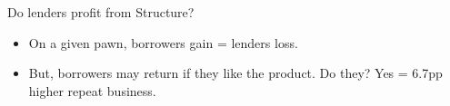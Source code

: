 \documentclass[9pt, aspectratio=169]{beamer}
\begin{document}
\begin{frame}{Do lenders profit from Structure?}

\begin{itemize}
    \item On a given pawn, borrowers gain = lenders loss.
    \item But, borrowers may return if they like the product. Do they? \pause Yes = 6.7pp higher repeat business. 
\end{itemize}
\begin{table}[H]
\begin{center}
\footnotesize{}
\end{center}
\end{table}    
    
\end{frame}
\end{document}
